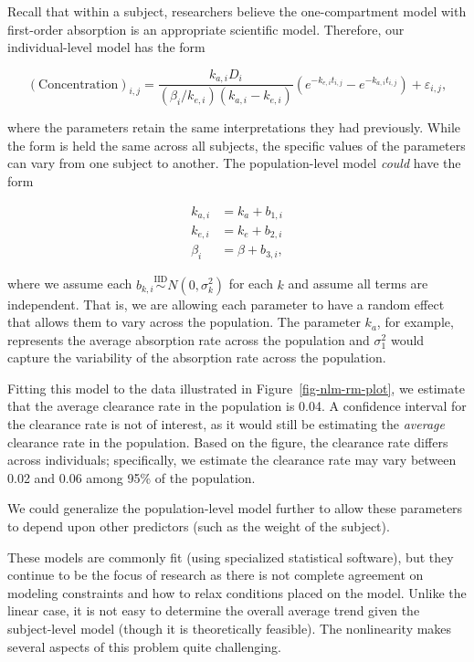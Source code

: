 \documentclass[
  letterpaper,
  DIV=11,
  numbers=noendperiod]{scrreprt}
\theoremstyle{definition}
\theoremstyle{definition}
\theoremstyle{remark}
\begin{document}
Recall that within a subject, researchers believe the one-compartment
model with first-order absorption is an appropriate scientific model.
Therefore, our individual-level model has the form

\[(\text{Concentration})_{i,j} = \frac{k_{a,i} D_i}{\left(\beta_i/k_{e,i}\right)\left(k_{a,i} - k_{e,i}\right)} \left(e^{-k_{e,i} t_{i,j}} - e^{-k_{a,i} t_{i,j}}\right) + \varepsilon_{i,j},\]

where the parameters retain the same interpretations they had
previously. While the form is held the same across all subjects, the
specific values of the parameters can vary from one subject to another.
The population-level model \emph{could} have the form

\[
\begin{aligned}
  k_{a,i} &= k_{a} + b_{1,i} \\
  k_{e,i} &= k_{e} + b_{2,i} \\
  \beta_i &= \beta + b_{3,i},
\end{aligned}
\]

where we assume each
\(b_{k,i} \stackrel{\text{IID}}{\sim} N\left(0, \sigma^2_k\right)\) for
each \(k\) and assume all terms are independent. That is, we are
allowing each parameter to have a random effect that allows them to vary
across the population. The parameter \(k_a\), for example, represents
the average absorption rate across the population and \(\sigma_1^2\)
would capture the variability of the absorption rate across the
population.

Fitting this model to the data illustrated in
Figure~\ref{fig-nlm-rm-plot}, we estimate that the average clearance
rate in the population is 0.04. A confidence interval for the clearance
rate is not of interest, as it would still be estimating the
\emph{average} clearance rate in the population. Based on the figure,
the clearance rate differs across individuals; specifically, we estimate
the clearance rate may vary between 0.02 and 0.06 among 95\% of the
population.

We could generalize the population-level model further to allow these
parameters to depend upon other predictors (such as the weight of the
subject).

These models are commonly fit (using specialized statistical software),
but they continue to be the focus of research as there is not complete
agreement on modeling constraints and how to relax conditions placed on
the model. Unlike the linear case, it is not easy to determine the
overall average trend given the subject-level model (though it is
theoretically feasible). The nonlinearity makes several aspects of this
problem quite challenging.
\end{document}
